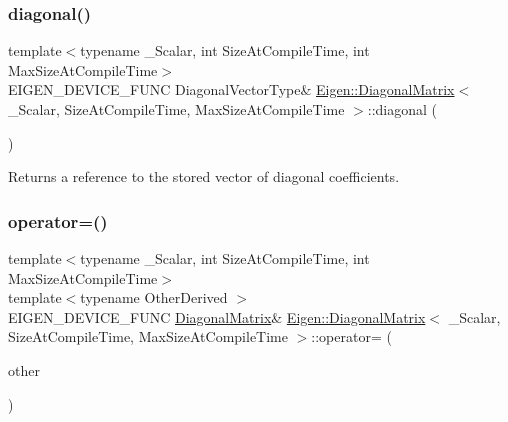 \subsubsection{\texorpdfstring{diagonal()}{diagonal()}\hspace{0.1cm}{\footnotesize\ttfamily [2/2]}}
{\footnotesize\ttfamily template$<$typename \+\_\+\+Scalar, int Size\+At\+Compile\+Time, int Max\+Size\+At\+Compile\+Time$>$ \\
E\+I\+G\+E\+N\+\_\+\+D\+E\+V\+I\+C\+E\+\_\+\+F\+U\+NC Diagonal\+Vector\+Type\& \mbox{\hyperlink{class_eigen_1_1_diagonal_matrix}{Eigen\+::\+Diagonal\+Matrix}}$<$ \+\_\+\+Scalar, Size\+At\+Compile\+Time, Max\+Size\+At\+Compile\+Time $>$\+::diagonal (\begin{DoxyParamCaption}{ }\end{DoxyParamCaption})\hspace{0.3cm}{\ttfamily [inline]}}

\begin{DoxyReturn}{Returns}
a reference to the stored vector of diagonal coefficients. 
\end{DoxyReturn}
\mbox{\label{class_eigen_1_1_diagonal_matrix_a0a189cd40211ce0790fb3fe218af2aed}} 
\subsubsection{\texorpdfstring{operator=()}{operator=()}\hspace{0.1cm}{\footnotesize\ttfamily [1/2]}}
{\footnotesize\ttfamily template$<$typename \+\_\+\+Scalar, int Size\+At\+Compile\+Time, int Max\+Size\+At\+Compile\+Time$>$ \\
template$<$typename Other\+Derived $>$ \\
E\+I\+G\+E\+N\+\_\+\+D\+E\+V\+I\+C\+E\+\_\+\+F\+U\+NC \mbox{\hyperlink{class_eigen_1_1_diagonal_matrix}{Diagonal\+Matrix}}\& \mbox{\hyperlink{class_eigen_1_1_diagonal_matrix}{Eigen\+::\+Diagonal\+Matrix}}$<$ \+\_\+\+Scalar, Size\+At\+Compile\+Time, Max\+Size\+At\+Compile\+Time $>$\+::operator= (\begin{DoxyParamCaption}\item[{const \mbox{\hyperlink{class_eigen_1_1_diagonal_base}{Diagonal\+Base}}$<$ Other\+Derived $>$ \&}]{other }\end{DoxyParamCaption})\hspace{0.3cm}{\ttfamily [inline]}}

